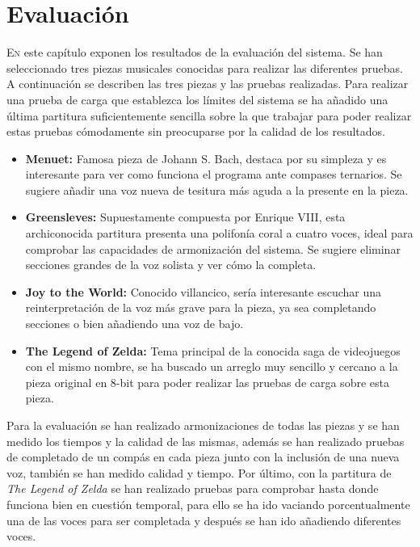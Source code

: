 \chapter{Evaluación}
\label{chap:evaluation}
\vspace{0.5cm}


 \lettrine{E}{n} este capítulo exponen los resultados de la evaluación del sistema. Se han seleccionado tres piezas musicales conocidas para realizar las diferentes pruebas. A continuación se describen las tres piezas y las pruebas realizadas. Para realizar una prueba de carga que establezca los límites del sistema se ha añadido una última partitura suficientemente sencilla sobre la que trabajar para poder realizar estas pruebas cómodamente sin preocuparse por la calidad de los resultados.
 
 \begin{itemize}
 	\item \textbf{Menuet:} Famosa pieza de Johann S. Bach, destaca por su simpleza y es interesante para ver como funciona el programa ante compases ternarios. Se sugiere añadir una voz nueva de tesitura más aguda a la presente en la pieza.
 	\item \textbf{Greensleves:} Supuestamente compuesta por Enrique VIII, esta archiconocida partitura presenta una polifonía coral a cuatro voces, ideal para comprobar las capacidades de armonización del sistema. Se sugiere eliminar secciones grandes de la voz solista y ver cómo la completa.
 	\item \textbf{Joy to the World:} Conocido villancico, sería interesante escuchar una reinterpretación de la voz más grave para la pieza, ya sea completando secciones o bien añadiendo una voz de bajo.
 	\item \textbf{The Legend of Zelda:} Tema principal de la conocida saga de videojuegos con el mismo nombre, se ha buscado un arreglo muy sencillo y cercano a la pieza original en 8-bit para poder realizar las pruebas de carga sobre esta pieza.
 \end{itemize}
 
 Para la evaluación se han realizado armonizaciones de todas las piezas y se han medido los tiempos y la calidad de las mismas, además se han realizado pruebas de completado de un compás en cada pieza junto con la inclusión de una nueva voz, también se han medido calidad y tiempo. Por último, con la partitura de \textit{The Legend of Zelda} se han realizado pruebas para comprobar hasta donde funciona bien en cuestión temporal, para ello se ha ido vaciando porcentualmente una de las voces para ser completada y después se han ido añadiendo diferentes voces.
 
